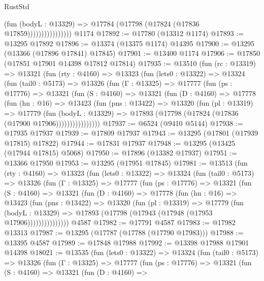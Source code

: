 \begin{lexlean}{RustStd}
\begin{coremodule}
                            (fun (bodyL : @13329) =>
                            @17784 (@17798 (@17824 (@17836 @17859))))))))))))))))
    @1174
@17892 := @17780 (@13312 @1174)
@17893 := @13295 @17892
@17896 := @13374 (@13375 @1174) @14395
@17900 := @13295 (@13366 (@17896 @17841) @17845)
@17901 := @13400 @1174
@17906 := @17850 (@17851 @17901 @14398 @17812 @17814)
@17935 := @13510
    (fun (rc : @13319) =>
    @13321
      (fun (rty : @4160) =>
      @13323
        (fun (lets0 : @13322) =>
        @13324
          (fun (tail0 : @5173) =>
          @13326
            (fun (Γ : @13325) =>
            @17777
              (fun (ps : @17776) =>
              @13321
                (fun (S : @4160) =>
                @13321
                  (fun (D : @4160) =>
                  @17778
                    (fun (hn : @16) =>
                    @13423
                      (fun (pns : @13422) =>
                      @13320
                        (fun (pl : @13319) =>
                        @17779
                          (fun (bodyL : @13329) =>
                          @17893 (@17798 (@17824 (@17836 (@17900 @17906))))))))))))))))
@17937 := @6524 (@9410 @5144)
@17938 := @17935 @17937
@17939 := @17809 @17937
@17943 := @13295 (@17801 (@17939 @17815) @17822)
@17944 := @17831 @17937
@17948 := @13295 (@13425 (@17944 @17815) @5068)
@17950 := @17896 (@13382 @17937)
@17951 := @13366 @17950
@17953 := @13295 (@17951 @17845)
@17981 := @13513
    (fun (rty : @4160) =>
    @13323
      (fun (lets0 : @13322) =>
      @13324
        (fun (tail0 : @5173) =>
        @13326
          (fun (Γ : @13325) =>
          @17777
            (fun (ps : @17776) =>
            @13321
              (fun (S : @4160) =>
              @13321
                (fun (D : @4160) =>
                @17778
                  (fun (hn : @16) =>
                  @13423
                    (fun (pns : @13422) =>
                    @13320
                      (fun (pl : @13319) =>
                      @17779
                        (fun (bodyL : @13329) =>
                        @17893 (@17798 (@17943 (@17948 (@17953 @17906)))))))))))))))
    @4587
@17982 := @17791 @4587
@17983 := @17982 @13313
@17987 := @13295 (@17787 (@17788 (@17790 @17983)))
@17988 := @13395 @4587
@17989 := @17848 @17988
@17992 := @13398 @17988 @17901 @14398
@18021 := @13535
    (fun (lets0 : @13322) =>
    @13324
      (fun (tail0 : @5173) =>
      @13326
        (fun (Γ : @13325) =>
        @17777
          (fun (ps : @17776) =>
          @13321
            (fun (S : @4160) =>
            @13321
              (fun (D : @4160) =>

\end{coremodule}
\end{lexlean}
